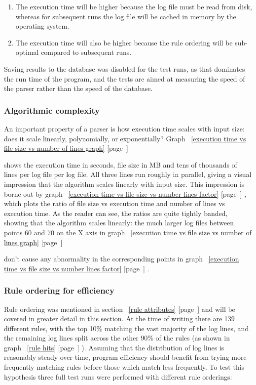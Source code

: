 \documentclass[a4paper,12pt,draft]{article}
\newcommand{\refwithpage}[1]{%
    \empty{}\ref{#1} [page~\pageref{#1}]%
}
\begin{document}
\begin{enumerate}

    \item The execution time will be higher because the log file must be
        read from disk, whereas for subsequent runs the log file will be
        cached in memory by the operating system.

    \item The execution time will also be higher because the rule ordering
        will be sub-optimal compared to subsequent runs.

\end{enumerate}

Saving results to the database was disabled for the test runs, as that
dominates the run time of the program, and the tests are aimed at measuring
the speed of the parser rather than the speed of the database.

\subsubsection{Algorithmic complexity}

An important property of a parser is how execution time scales with input
size: does it scale linearly, polynomially, or exponentially?
Graph~\refwithpage{execution time vs file size vs number of lines graph}
shows the execution time in seconds, file size in MB and tens of thousands
of lines per log file per log file.  All three lines run roughly in
parallel, giving a visual impression that the algorithm scales linearly
with input size.  This impression is borne out by
graph~\refwithpage{execution time vs file size vs number lines factor},
which plots the ratio of file size vs execution time and number of lines vs
execution time.  As the reader can see, the ratios are quite tightly
banded, showing that the algorithm scales linearly: the much larger log
files between points 60 and 70 on the X axis in
graph~\refwithpage{execution time vs file size vs number of lines graph}
don't cause any abnormality in the corresponding points in
graph~\refwithpage{execution time vs file size vs number lines factor}.


\subsubsection{Rule ordering for efficiency}

\label{rule ordering for efficiency}

Rule ordering was mentioned in section~\refwithpage{rule attributes} and
will be covered in greater detail in this section.  At the time of writing
there are 139 different rules, with the top 10\% matching the vast majority
of the log lines, and the remaining log lines split across the other 90\%
of the rules (as shown in graph~\refwithpage{rule hits}).  Assuming that
the distribution of log lines is reasonably steady over time, program
efficiency should benefit from trying more frequently matching rules before
those which match less frequently.  To test this hypothesis three full test
runs were performed with different rule orderings:
\end{document}
